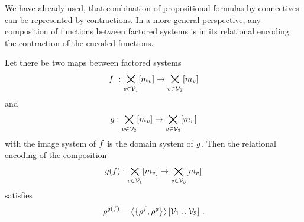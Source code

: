 We have already used, that combination of propositional formulas by connectives can be represented by contractions.
In a more general perspective, any composition of functions between factored systems is in its relational encoding the contraction of the encoded functions.

\begin{theorem}\label{the:compositionByContraction}
	Let there be two maps between factored systems 
		\[ \exfunction : \bigtimes_{\node\in\nodes_1} [\catdimof{\node}] \rightarrow \bigtimes_{\node\in\nodes_2} [\catdimof{\node}] \]
	and 
		\[ g : \bigtimes_{v\in\mathcal{V}_2} [m_{v}] \rightarrow \bigtimes_{v\in\mathcal{V}_3} [m_{v}] \]
	with the image system of $f$ is the domain system of $g$.
	Then the relational encoding of the composition 
		\[ g(f) :  \bigtimes_{v\in\mathcal{V}_1} [m_{v}] \rightarrow \bigtimes_{v\in\mathcal{V}_3} [m_{v}] \]
	satisfies
		\[ \rho^{g(f)} = \left\langle \{\rho^{f},\rho^{g}\}\right\rangle \left[ \mathcal{V}_1\cup\mathcal{V}_3 \right] \, .  \]
\end{theorem}
